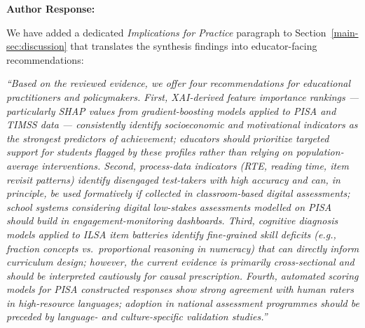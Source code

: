 \documentclass[12pt, a4paper]{article}
\newcommand{\R}[1]{Section~\ref{main-#1}}
\newenvironment{authorresponse}{%
  \begin{mdframed}[linecolor=authorcolor, linewidth=1pt,
    backgroundcolor=authorcolor!5, innertopmargin=8pt, innerbottommargin=8pt]
  \color{authorcolor}\textbf{Author Response:}\normalcolor\par\smallskip
}{%
  \end{mdframed}\bigskip
}
\newcommand{\changed}[1]{\textcolor{changedcolor}{\textit{#1}}}
\begin{document}
\begin{authorresponse}
We have added a dedicated \textit{Implications for Practice} paragraph to
\R{sec:discussion} that translates the synthesis findings into
educator-facing recommendations:

\changed{``Based on the reviewed evidence, we offer four recommendations
for educational practitioners and policymakers. First, XAI-derived feature
importance rankings --- particularly SHAP values from gradient-boosting
models applied to PISA and TIMSS data --- consistently identify
socioeconomic and motivational indicators as the strongest predictors of
achievement; educators should prioritize targeted support for students
flagged by these profiles rather than relying on population-average
interventions. Second, process-data indicators (RTE, reading time, item
revisit patterns) identify disengaged test-takers with high accuracy and
can, in principle, be used formatively if collected in classroom-based
digital assessments; school systems considering digital low-stakes
assessments modelled on PISA should build in engagement-monitoring
dashboards. Third, cognitive diagnosis models applied to ILSA item
batteries identify fine-grained skill deficits (e.g., fraction concepts
vs.\ proportional reasoning in numeracy) that can directly inform
curriculum design; however, the current evidence is primarily
cross-sectional and should be interpreted cautiously for causal
prescription. Fourth, automated scoring models for PISA constructed
responses show strong agreement with human raters in high-resource
languages; adoption in national assessment programmes should be preceded
by language- and culture-specific validation studies.''}
\end{authorresponse}
\end{document}
